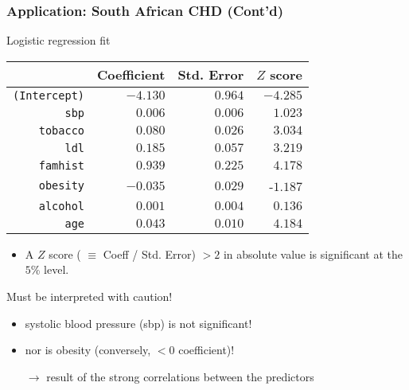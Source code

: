 \documentclass[compress, smaller, serif, 9pt]{beamer}
\begin{document}
\begin{frame}
  \frametitle{Application: South African CHD (Cont'd)}

\begin{block}{Logistic regression fit}
\begin{center}
\small
\begin{tabular}{rrrr}\hline
& Coefficient & Std. Error & $Z$ score\\
\hline
\texttt{(Intercept)} & $-4.130$ & $0.964$ & $-4.285$\\
\texttt{sbp} & $0.006$ & $0.006$ & $1.023$\\
\texttt{tobacco} & $0.080$ & $0.026$ & $3.034$\\
\texttt{ldl} & $0.185$ & $0.057$ & $3.219$\\
\texttt{famhist} & $0.939$ & $0.225$ & $4.178$\\
\texttt{obesity} & $-0.035$ & $0.029$ & -$1.187$\\
\texttt{alcohol} & $0.001$ & $0.004$ & $0.136$\\
\texttt{age} & $0.043$ & $0.010$ & $4.184$\\
\hline
\end{tabular} 
\end{center}
\end{block}
\begin{itemize}
   \item A  $Z$ score ( $\equiv$ Coeff / Std. Error)  $> 2$ in absolute value is  significant at
   the $5$\% level.
\end{itemize}
\begin{alertblock}{Must be interpreted with caution!}
\begin{itemize}
   \item systolic blood pressure (sbp) is not significant! 
   \item nor is obesity (conversely, $<0$ coefficient)!
   \item[$\rightarrow$] result of the strong correlations between the predictors
\end{itemize}
\end{alertblock}
\end{frame}
\end{document}
